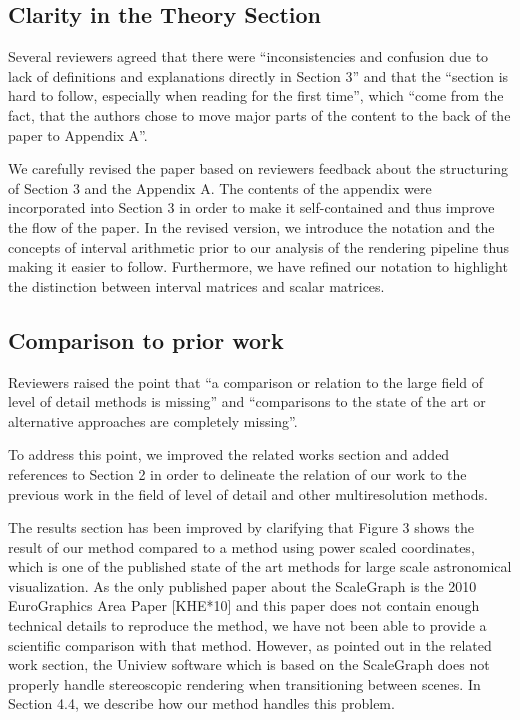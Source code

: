 \documentclass{article}
\begin{document}
\begin{tcolorbox}
\subsection{Clarity in the Theory Section}\label{concern:structure}
Several reviewers agreed that there were ``inconsistencies and confusion due to lack of definitions and explanations directly in Section 3'' and that the ``section is hard to follow, especially when reading for the first time'', which ``come from the fact, that the authors chose to move major parts of the content to the back of the paper to Appendix A''.
\end{tcolorbox}
We carefully revised the paper based on reviewers feedback about the structuring of Section 3 and the Appendix A.
The contents of the appendix were incorporated into Section 3 in order to make it self-contained and thus improve the flow of the paper.
In the revised version, we introduce the notation and the concepts of interval arithmetic prior to our analysis of the rendering pipeline thus making it easier to follow.
Furthermore, we have refined our notation to highlight the distinction between interval matrices and scalar matrices.

\vspace*{1cm}


\begin{tcolorbox}
\subsection{Comparison to prior work}\label{concern:comparisons}
Reviewers raised the point that ``a comparison or relation to the large field of level of detail methods is missing'' and ``comparisons to the state of the art or alternative approaches are completely missing''.
\end{tcolorbox}
To address this point, we improved the related works section and added references to Section 2 in order to delineate the relation of our work to the previous work in the field of level of detail and other multiresolution methods.

The results section has been improved by clarifying that Figure 3 shows the result of our method compared to a method using power scaled coordinates, which is one of the published state of the art methods for large scale astronomical visualization.
As the only published paper about the ScaleGraph is the 2010 EuroGraphics Area Paper [KHE*10] and this paper does not contain enough technical details to reproduce the method, we have not been able to provide a scientific comparison with that method.
However, as pointed out in the related work section, the Uniview software which is based on the ScaleGraph does not properly handle stereoscopic rendering when transitioning between scenes.
In Section 4.4, we describe how our method handles this problem.
\end{document}
